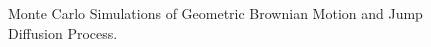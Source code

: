 \documentclass[paper.tex]{subfiles}
\begin{document}
    \begin{figure}[ht!]
        \centering
        \qquad
        \caption{Monte Carlo Simulations of Geometric Brownian Motion and Jump Diffusion Process.}
        \label{fig: monte-carlo-simulations-2}
    \end{figure}
\end{document}
